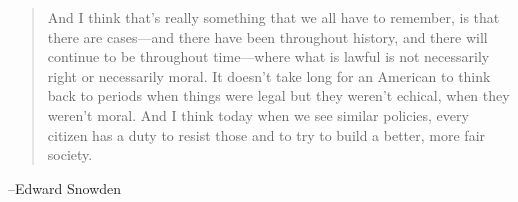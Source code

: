 \documentclass[letterpaper, landscape]{exam}
\begin{document}
  \else
    \vspace{2 cm}
    \begin{quote}
      \begin{em}
        And I think that's really something that we all have to remember, is
        that there are cases---and there have been throughout history, and there
        will continue to be throughout time---where what is lawful is not
        necessarily right or necessarily moral. It doesn't take long for an
        American to think back to periods when things were legal but they
        weren't echical, when they weren't moral. And I think today when we see
        similar policies, every citizen has a duty to resist those and to try to
        build a better, more fair society.
      \end{em}
    \end{quote}
    \hspace{1 cm}--Edward Snowden
  \fi
\end{document}
